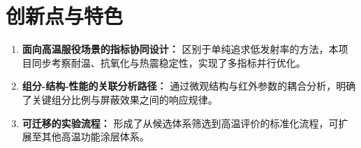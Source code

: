 \chapter{创新点与特色}

\begin{enumerate}
  \item \textbf{面向高温服役场景的指标协同设计：} 区别于单纯追求低发射率的方法，本项目同步考察耐温、抗氧化与热震稳定性，实现了多指标并行优化。
  \item \textbf{组分-结构-性能的关联分析路径：} 通过微观结构与红外参数的耦合分析，明确了关键组分比例与屏蔽效果之间的响应规律。
  \item \textbf{可迁移的实验流程：} 形成了从候选体系筛选到高温评价的标准化流程，可扩展至其他高温功能涂层体系。
\end{enumerate}
